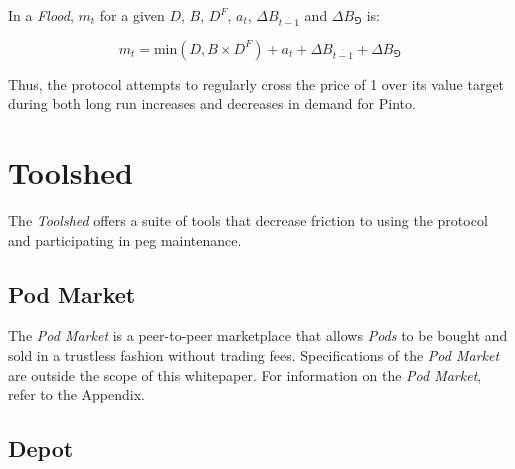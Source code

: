 \documentclass[tikz]{article}
\newcommand{\term}[1]{\textsl{#1}}
\newcommand{\Pinto}{} %
\begin{document}
\vspace{-0.05cm}

In a \term{Flood}, $m_{t}$ for a given $D$, $B$, $D^{F}$, $a_{t}$, $\Delta B_{\overline{t-1}}$ and $\Delta B_{\Game}$ is:

\vspace{-0.05cm}

    $$
        m_{t} = 
            \text{min}(D, B \times D^{F}) + 
            a_{t} + 
            \Delta B_{\overline{t-1}} + 
            \Delta B_{\Game}
    $$

\vspace{-0.05cm}

Thus, the protocol attempts to regularly cross the price of \Pinto1 over its value target during both long run increases and decreases in demand for Pinto.


\section{Toolshed}
\vspace{0.1cm}

The \term{Toolshed} offers a suite of tools that decrease friction to using the protocol and participating in peg maintenance.


\vspace{0.1cm}
\subsection{Pod Market}
\vspace{0.1cm}

The \term{Pod Market} is a peer-to-peer marketplace that allows \term{Pods} to be bought and sold in a trustless fashion without trading fees. Specifications of the \term{Pod Market} are outside the scope of this whitepaper. For information on the \term{Pod Market}, refer to the Appendix.


\vspace{0.1cm}
\subsection{Depot}
\vspace{0.1cm}
\end{document}
